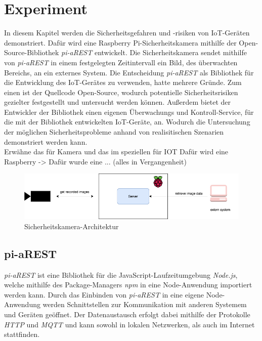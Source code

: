 \section{Experiment}
In diesem Kapitel werden die Sicherheitsgefahren und -risiken von IoT-Geräten demonstriert. 
Dafür wird eine Raspberry Pi-Sicherheitskamera mithilfe der Open-Source-Bibliothek \textit{pi-aREST} 
entwickelt. Die Sicherheitskamera sendet mithilfe von \textit{pi-aREST} in einem festgelegten 
Zeitintervall ein Bild, des überwachten Bereichs, an ein externes System. Die Entscheidung \textit{pi-aREST} 
als Bibliothek für die Entwicklung des IoT-Gerätes zu verwenden, hatte mehrere Gründe. 
Zum einen ist der Quellcode Open-Source, wodurch potentielle Sicherheitsrisiken gezielter festgestellt
und untersucht werden können. Außerdem bietet der Entwickler der Bibliothek einen eigenen Überwachungs 
und Kontroll-Service, für die mit der Bibliothek entwickelten IoT-Geräte, an. Wodurch die Untersuchung
der möglichen Sicherheitsprobleme anhand von realisitischen Szenarien demonstriert werden kann.  \\

Erwähne das für Kamera und das im speziellen für IOT
Dafür wird eine Raspberry -> Dafür wurde eine ... (alles in Vergangenheit)

\begin{figure}[h]
  \centering
  \includegraphics[width=145mm]{images/raspberrypi.png}
  \caption{Sicherheitskamera-Architektur}
  \label{fig:arch-raspberrypi}
\end{figure}


\subsection{pi-aREST}
\textit{pi-aREST} ist eine Bibliothek für die JavaScript-Laufzeitumgebung \textit{Node.js}, welche mithilfe
des Package-Managers \textit{npm} in eine Node-Anwendung importiert werden kann. Durch das Einbinden
von \textit{pi-aREST} in eine eigene Node-Anwendung werden Schnittstellen zur Kommunikation mit anderen
Systemem und Geräten geöffnet. Der Datenaustausch erfolgt dabei mithilfe der Protokolle \textit{HTTP} 
und \textit{MQTT} und kann sowohl in lokalen Netzwerken, als auch im Internet stattfinden.

